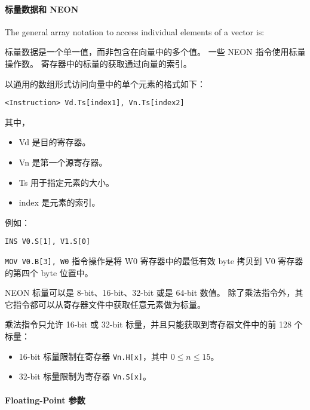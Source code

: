
\paragraph{标量数据和 NEON}

The general array notation to access individual elements of a vector is:

标量数据是一个单一值，而非包含在向量中的多个值。
一些 NEON 指令使用标量操作数。
寄存器中的标量的获取通过向量的索引。

以通用的数组形式访问向量中的单个元素的格式如下：

\lstinline!<Instruction> Vd.Ts[index1], Vn.Ts[index2]!

其中，

\begin{itemize}
  \item[] Vd 是目的寄存器。
  \item[] Vn 是第一个源寄存器。
  \item[] Ts 用于指定元素的大小。
  \item[] index 是元素的索引。
\end{itemize}

例如：

\lstinline[language={[ARM]Assembler}]!INS V0.S[1], V1.S[0]!


\lstinline!MOV V0.B[3], W0! 指令操作是将 W0 寄存器中的最低有效 byte 拷贝到 V0 寄存器的第四个 byte 位置中。


NEON 标量可以是 8-bit、16-bit、32-bit 或是 64-bit 数值。
除了乘法指令外，其它指令都可以从寄存器文件中获取任意元素做为标量。

乘法指令只允许 16-bit 或 32-bit 标量，并且只能获取到寄存器文件中的前 128 个标量：

\begin{itemize}
  \item 16-bit 标量限制在寄存器 \lstinline!Vn.H[x]!，其中 $0 \leq n \leq 15$。
  \item 32-bit 标量限制为寄存器 \lstinline!Vn.S[x]!。
\end{itemize}

\paragraph{Floating-Point 参数}


